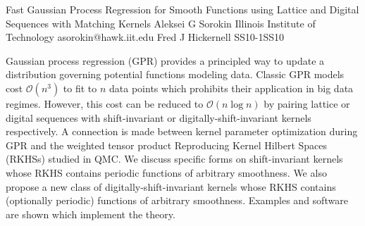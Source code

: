 \begin{talk}
  {Fast Gaussian Process Regression for Smooth Functions using Lattice and Digital Sequences with Matching Kernels}%
  {Aleksei G Sorokin}%
  {Illinois Institute of Technology}%
  {asorokin@hawk.iit.edu}%
  {Fred J Hickernell}%
{}{}{SS10-1}{SS10}


				
				

Gaussian process regression (GPR) provides a principled way to update a distribution governing potential functions modeling data. Classic GPR  models cost $\mathcal{O}(n^3)$ to fit to $n$ data points which prohibits their application in big data regimes. However, this cost can be reduced to $\mathcal{O}(n \log n)$ by pairing lattice or digital sequences with shift-invariant or digitally-shift-invariant kernels respectively. A connection is made between kernel parameter optimization during GPR and the weighted tensor product Reproducing Kernel Hilbert Spaces (RKHSs) studied in QMC. We discuss specific forms on shift-invariant kernels whose RKHS contains periodic functions of arbitrary smoothness. We also propose a new class of digitally-shift-invariant kernels whose RKHS contains (optionally periodic) functions of arbitrary smoothness. Examples and software are shown which implement the theory.
\end{talk}

